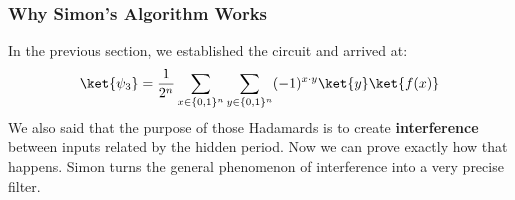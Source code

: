 \subsubsection{Why Simon's Algorithm Works}\label{sec:why-simons-algorithm-works}

In the previous section, we established the circuit and arrived at:
\begin{equation*}
    \ket{\psi_{3}} = \frac{1}{2^{n}} \sum_{x \in \{0,1\}^{n}} \sum_{y \in \{0,1\}^{n}} (-1)^{x \cdot y} \ket{y} \ket{f(x)}
\end{equation*}
We also said that the purpose of those Hadamards is to create \textbf{interference} between inputs related by the hidden period. Now we can prove exactly how that happens. Simon turns the general phenomenon of interference into a very precise filter.

